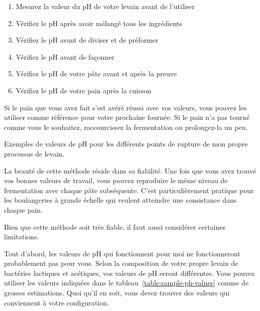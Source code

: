 \begin{enumerate}
  \item Mesurez la valeur du pH de votre levain avant de l'utiliser
  \item Vérifiez le pH après avoir mélangé tous les ingrédients
  \item Vérifiez le pH avant de diviser et de préformer
  \item Vérifiez le pH avant de façonner
  \item Vérifiez le pH de votre pâte avant et après la preuve
  \item Vérifiez le pH de votre pain après la cuisson
\end{enumerate}

Si le pain que vous avez fait s'est avéré réussi avec vos valeurs,
vous pouvez les utiliser comme référence pour votre prochaine fournée. Si le
pain n'a pas tourné comme vous le souhaitez, raccourcissez
la fermentation ou prolongez-la un peu.

\begin{table}[!htb]
    \begin{center}
        \caption[Valeurs de pH de la pâte pendant la préparation du pain]{Exemples de valeurs de pH pour
            les différents points de rupture de mon propre processus de levain.}%
        \label{table:sample-ph-values}
    \end{center}
\end{table}

La beauté de cette méthode réside dans sa fiabilité. Une fois que vous avez trouvé
vos bonnes valeurs de travail, vous pouvez reproduire
le même niveau de fermentation avec chaque pâte subséquente.
C'est particulièrement pratique pour les boulangeries à grande échelle qui veulent
atteindre une consistance dans chaque pain.

Bien que cette méthode soit très fiable, il faut aussi considérer certaines
limitations.

Tout d'abord, les valeurs de pH qui fonctionnent pour moi ne fonctionneront probablement pas pour
vous. Selon la composition de votre propre levain de bactéries lactiques
et acétiques, vos valeurs de pH seront différentes.
Vous pouvez utiliser les valeurs indiquées dans le tableau~\ref{table:sample-ph-values}
comme de grosses estimations. Quoi qu'il en soit, vous devez trouver des valeurs
qui conviennent à votre configuration.


